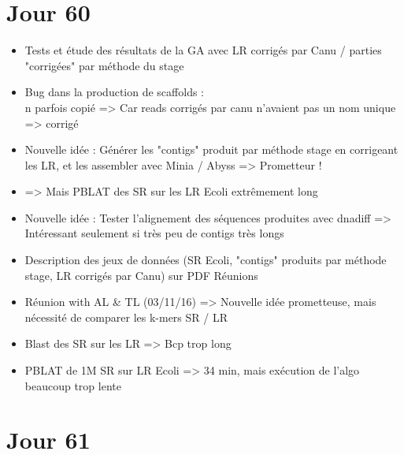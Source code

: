 \documentclass[12pt]{report}
\begin{document}
\section{Jour 60}

\begin{itemize}
	\item Tests et étude des résultats de la GA avec LR corrigés par Canu / parties "corrigées" par méthode du stage
	
	\item Bug dans la production de scaffolds : \\n parfois copié => Car reads corrigés par canu n'avaient pas un nom unique => corrigé

	\item Nouvelle idée : Générer les "contigs" produit par méthode stage en corrigeant les LR, et les assembler avec Minia / Abyss => Prometteur !
	
	\item => Mais PBLAT des SR sur les LR Ecoli extrêmement long
	
	\item Nouvelle idée : Tester l'alignement des séquences produites avec dnadiff => Intéressant seulement si très peu de contigs très longs
	
	\item Description des jeux de données (SR Ecoli, "contigs" produits par méthode stage, LR corrigés par Canu) sur PDF Réunions
	
	\item Réunion with AL \& TL (03/11/16) => Nouvelle idée prometteuse, mais nécessité de comparer les k-mers SR / LR
	
	\item Blast des SR sur les LR => Bcp trop long
	
	\item PBLAT de 1M SR sur LR Ecoli => 34 min, mais exécution de l'algo beaucoup trop lente
\end{itemize}

\section{Jour 61}
\end{document}
